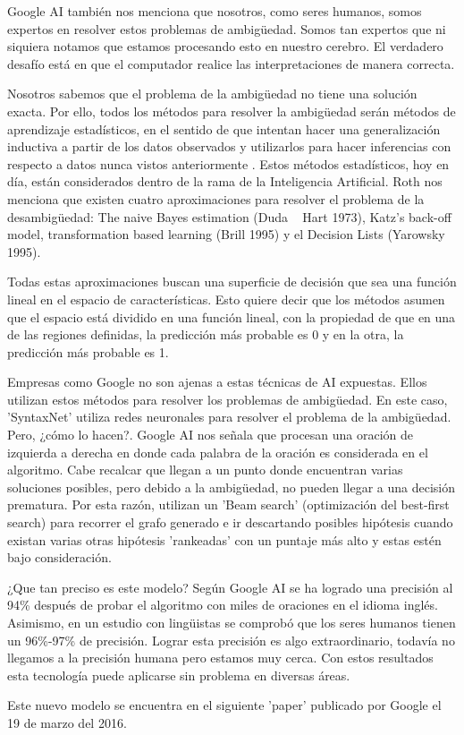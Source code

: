 Google AI \cite{GoogleAISyntaxNet} también nos menciona que nosotros, como seres humanos, somos expertos en resolver estos problemas de ambigüedad. Somos tan expertos que ni siquiera notamos que estamos procesando esto en nuestro cerebro. El verdadero desafío está en que el computador realice las interpretaciones de manera correcta.

Nosotros sabemos que el problema de la ambigüedad no tiene una solución exacta. Por ello, todos los métodos para resolver la ambigüedad serán métodos de aprendizaje estadísticos, en el sentido de que intentan hacer una generalización inductiva a partir de los datos observados y utilizarlos para hacer inferencias con respecto a datos nunca vistos anteriormente \cite{Amb}. Estos métodos estadísticos, hoy en día, están considerados dentro de la rama de la Inteligencia Artificial. Roth \cite{Amb} nos menciona que existen cuatro aproximaciones para resolver el problema de la desambigüedad: The naive Bayes estimation (Duda ~ Hart 1973), Katz's back-off model, transformation based learning (Brill 1995) y el Decision Lists (Yarowsky 1995).

Todas estas aproximaciones buscan una superficie de decisión que sea una función lineal en el espacio de características. Esto quiere decir que los métodos asumen que el espacio está dividido en una función lineal, con la propiedad de que en una de  las regiones definidas, la predicción más probable es 0 y en la otra, la predicción más probable es 1. \cite{Amb}

Empresas como Google no son ajenas a estas técnicas de AI expuestas. Ellos utilizan estos métodos para resolver los problemas de ambigüedad. En este caso, 'SyntaxNet' utiliza redes neuronales para resolver el problema de la ambigüedad. Pero, ¿cómo lo hacen?. Google AI \cite{GoogleAISyntaxNet} nos señala que procesan una oración de izquierda a derecha en donde cada palabra de la oración es considerada en el algoritmo. Cabe recalcar que llegan a un punto donde encuentran varias soluciones posibles, pero debido a la ambigüedad, no pueden llegar a una decisión prematura. Por esta razón, utilizan un 'Beam search' (optimización del best-first search) para recorrer el grafo generado e ir descartando posibles hipótesis cuando existan varias otras hipótesis 'rankeadas' con un puntaje más alto y estas estén bajo consideración.

¿Que tan preciso es este modelo? Según Google AI \cite{GoogleAISyntaxNet} se ha logrado una precisión al 94\% después de probar el algoritmo con miles de oraciones en el idioma inglés. Asimismo, en un estudio con lingüistas se comprobó que los seres humanos tienen un 96\%-97\% de precisión. Lograr esta precisión es algo extraordinario, todavía no llegamos a la precisión humana pero estamos muy cerca. Con estos resultados esta tecnología puede aplicarse sin problema en diversas áreas.

Este nuevo modelo se encuentra en el siguiente 'paper' \cite{GoogleAISyntaxPaper} publicado por Google el 19 de marzo del 2016.